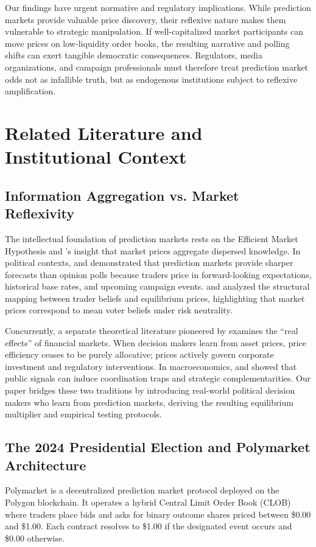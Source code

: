 \documentclass[12pt]{article}
\begin{document}
Our findings have urgent normative and regulatory implications. While prediction markets provide valuable price discovery, their reflexive nature makes them vulnerable to strategic manipulation. If well-capitalized market participants can move prices on low-liquidity order books, the resulting narrative and polling shifts can exert tangible democratic consequences. Regulators, media organizations, and campaign professionals must therefore treat prediction market odds not as infallible truth, but as endogenous institutions subject to reflexive amplification.

\section{Related Literature and Institutional Context}

\subsection{Information Aggregation vs. Market Reflexivity}
The intellectual foundation of prediction markets rests on the Efficient Market Hypothesis and \citet{hayek1945use}'s insight that market prices aggregate dispersed knowledge. In political contexts, \citet{wolfers2004prediction} and \citet{snowberg2007partisan} demonstrated that prediction markets provide sharper forecasts than opinion polls because traders price in forward-looking expectations, historical base rates, and upcoming campaign events. \citet{manski2006interpreting} and \citet{rothschild2016trading} analyzed the structural mapping between trader beliefs and equilibrium prices, highlighting that market prices correspond to mean voter beliefs under risk neutrality.

Concurrently, a separate theoretical literature pioneered by \citet{bond2012real} examines the ``real effects'' of financial markets. When decision makers learn from asset prices, price efficiency ceases to be purely allocative; prices actively govern corporate investment and regulatory interventions. In macroeconomics, \citet{morris2002social} and \citet{angeletos2007dynamic} showed that public signals can induce coordination traps and strategic complementarities. Our paper bridges these two traditions by introducing real-world political decision makers who learn from prediction markets, deriving the resulting equilibrium multiplier and empirical testing protocols.

\subsection{The 2024 Presidential Election and Polymarket Architecture}
Polymarket is a decentralized prediction market protocol deployed on the Polygon blockchain. It operates a hybrid Central Limit Order Book (CLOB) where traders place bids and asks for binary outcome shares priced between \$0.00 and \$1.00. Each contract resolves to \$1.00 if the designated event occurs and \$0.00 otherwise.
\end{document}
